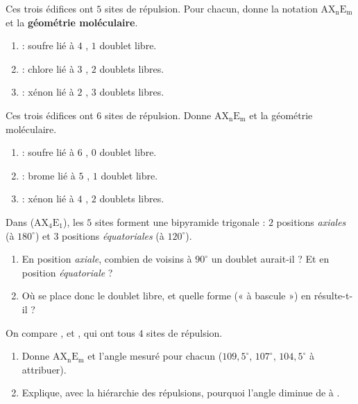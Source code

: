 \documentclass[11pt,a4paper]{article}
\begin{document}
\newcommand{\AX}[2]{\ensuremath{\mathrm{AX_{#1}E_{#2}}}}
\begin{exo}
Ces trois édifices ont $5$ sites de répulsion. Pour chacun, donne la notation \AX{n}{m} et la
\textbf{géométrie moléculaire}.
\begin{enumerate}[label=\alph*)]
  \item {} : soufre lié à $4$ , $1$ doublet libre.
  \item {} : chlore lié à $3$ , $2$ doublets libres.
  \item {} : xénon lié à $2$ , $3$ doublets libres.
\end{enumerate}
\end{exo}

\begin{exo}
Ces trois édifices ont $6$ sites de répulsion. Donne \AX{n}{m} et la géométrie moléculaire.
\begin{enumerate}[label=\alph*)]
  \item {} : soufre lié à $6$ , $0$ doublet libre.
  \item {} : brome lié à $5$ , $1$ doublet libre.
  \item {} : xénon lié à $4$ , $2$ doublets libres.
\end{enumerate}
\end{exo}

\begin{exo}
Dans  (\AX{4}{1}), les $5$ sites forment une bipyramide trigonale : $2$ positions
\emph{axiales} (à $180^\circ$) et $3$ positions \emph{équatoriales} (à $120^\circ$).
\begin{enumerate}[label=\alph*)]
  \item En position \emph{axiale}, combien de voisins à $90^\circ$ un doublet aurait-il ? Et en
        position \emph{équatoriale} ?
  \item Où se place donc le doublet libre, et quelle forme (« à bascule ») en résulte-t-il ?
\end{enumerate}
\end{exo}

\begin{exo}
On compare ,  et , qui ont tous $4$ sites de répulsion.
\begin{enumerate}[label=\alph*)]
  \item Donne \AX{n}{m} et l'angle mesuré pour chacun ($109{,}5^\circ$, $107^\circ$, $104{,}5^\circ$
        à attribuer).
  \item Explique, avec la hiérarchie des répulsions, pourquoi l'angle diminue de  à .
\end{enumerate}
\end{exo}
\end{document}
